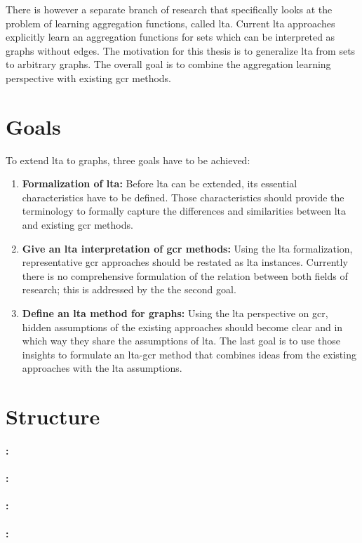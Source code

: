 There is however a separate branch of research that specifically looks at the problem of learning aggregation functions, called \ac{lta}.
Current \ac{lta} approaches explicitly learn an aggregation functions for sets which can be interpreted as graphs without edges.
The motivation for this thesis is to generalize \ac{lta} from sets to arbitrary graphs.
The overall goal is to combine the aggregation learning perspective with existing \ac{gcr} methods.

\section{Goals}%
\label{sec:intro:goals}

To extend \ac{lta} to graphs, three goals have to be achieved:
\begin{enumerate}[label=\textbf{\arabic*.}]
	\item \textbf{Formalization of \ac{lta}:}
		Before \ac{lta} can be extended, its essential characteristics have to be defined.
		Those characteristics should provide the terminology to formally capture the differences and similarities between \ac{lta} and existing \ac{gcr} methods.
	\item \textbf{Give an \ac{lta} interpretation of \ac{gcr} methods:}
		Using the \ac{lta} formalization, representative \ac{gcr} approaches should be restated as \ac{lta} instances.
		Currently there is no comprehensive formulation of the relation between both fields of research;
		this is addressed by the the second goal.
	\item \textbf{Define an \ac{lta} method for graphs:}
		Using the \ac{lta} perspective on \ac{gcr}, hidden assumptions of the existing approaches should become clear and in which way they share the assumptions of \ac{lta}.
		The last goal is to use those insights to formulate an \ac{lta}-\ac{gcr} method that combines ideas from the existing approaches with the \ac{lta} assumptions.
\end{enumerate}

\section{Structure}%
\label{sec:intro:structure}

\paragraph{: }

\paragraph{: }

\paragraph{: }

\paragraph{: }
